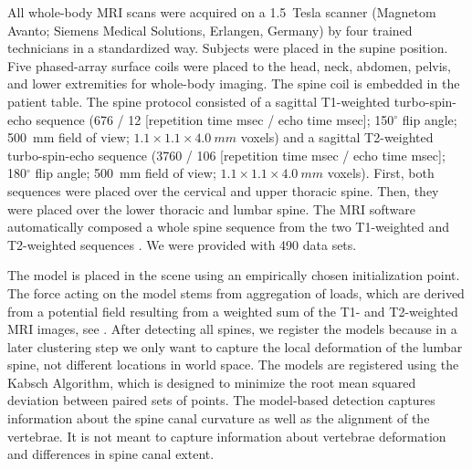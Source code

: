 \documentclass[journal]{style/vgtc}           %
\begin{document}
All whole-body MRI scans were acquired on a 1.5~Tesla scanner (Magnetom Avanto; Siemens Medical Solutions, Erlangen, Germany) by four trained technicians in a standardized way. Subjects were placed in the supine position. Five phased-array surface coils were placed to the head, neck, abdomen, pelvis, and lower extremities for whole-body imaging. The spine coil is embedded in the patient table. The spine protocol consisted of a sagittal T1-weighted turbo-spin-echo sequence (676 / 12 [repetition time msec / echo time msec]; 150$^\circ$ flip angle; 500~mm field of view; $1.1\times1.1\times4.0~mm$ voxels) and a sagittal T2-weighted turbo-spin-echo sequence (3760 / 106 [repetition time msec / echo time msec]; 180$^\circ$ flip angle; 500~mm field of view; $1.1\times1.1\times4.0~mm$ voxels). First, both sequences were placed over the cervical and upper thoracic spine. Then, they were placed over the lower thoracic and lumbar spine. The MRI software automatically composed a whole spine sequence from the two T1-weighted and T2-weighted sequences \cite{Hegenscheid2013}. We were provided with 490 data sets.

The model is placed in the scene using an empirically chosen initialization point. The force acting on the model stems from aggregation of loads, which are derived from a potential field resulting from a weighted sum of the T1- and T2-weighted MRI images, see \cite{Rak2013}. After detecting all spines, we register the models because in a later clustering step we only want to capture the local deformation of the lumbar spine, not different locations in world space. The models are registered using the Kabsch Algorithm, which is designed to minimize the root mean squared deviation between paired sets of points.
The model-based detection captures information about the spine canal curvature as well as the alignment of the vertebrae. It is not meant to capture information about vertebrae deformation and differences in spine canal extent.
\end{document}
